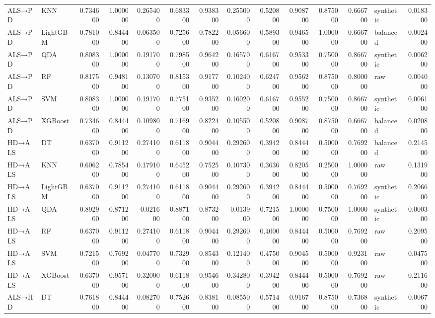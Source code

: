 \begin{longtable}{llrrrrrrrrrrlr}
ALS→PD & KNN & 0.734600 & 1.000000 & 0.265400 & 0.683300 & 0.938300 & 0.255000 & 0.520800 & 0.908700 & 0.875000 & 0.666700 & synthetic & 0.018300 \\
ALS→PD & LightGBM & 0.781000 & 0.844400 & 0.063500 & 0.725600 & 0.782200 & 0.056600 & 0.589300 & 0.946500 & 1.000000 & 0.666700 & balanced & 0.002400 \\
ALS→PD & QDA & 0.808300 & 1.000000 & 0.191700 & 0.798500 & 0.964200 & 0.165700 & 0.616700 & 0.953300 & 0.750000 & 0.866700 & synthetic & 0.006200 \\
ALS→PD & RF & 0.817500 & 0.948100 & 0.130700 & 0.815300 & 0.917700 & 0.102400 & 0.624700 & 0.956200 & 0.875000 & 0.800000 & raw & 0.004000 \\
ALS→PD & SVM & 0.808300 & 1.000000 & 0.191700 & 0.775100 & 0.935200 & 0.160200 & 0.616700 & 0.955200 & 0.750000 & 0.866700 & synthetic & 0.006100 \\
ALS→PD & XGBoost & 0.734600 & 0.844400 & 0.109800 & 0.716900 & 0.822400 & 0.105500 & 0.520800 & 0.908700 & 0.875000 & 0.666700 & balanced & 0.020800 \\
HD→ALS & DT & 0.637000 & 0.911200 & 0.274100 & 0.611800 & 0.904400 & 0.292600 & 0.394200 & 0.844400 & 0.500000 & 0.769200 & balanced & 0.214500 \\
HD→ALS & KNN & 0.606200 & 0.785400 & 0.179100 & 0.645200 & 0.752500 & 0.107300 & 0.363600 & 0.820500 & 0.250000 & 1.000000 & raw & 0.131900 \\
HD→ALS & LightGBM & 0.637000 & 0.911200 & 0.274100 & 0.611800 & 0.904400 & 0.292600 & 0.394200 & 0.844400 & 0.500000 & 0.769200 & synthetic & 0.206600 \\
HD→ALS & QDA & 0.892900 & 0.871200 & -0.021600 & 0.887100 & 0.873200 & -0.013900 & 0.721500 & 1.000000 & 0.750000 & 1.000000 & synthetic & 0.000300 \\
HD→ALS & RF & 0.637000 & 0.911200 & 0.274100 & 0.611800 & 0.904400 & 0.292600 & 0.400000 & 0.844400 & 0.500000 & 0.769200 & raw & 0.209500 \\
HD→ALS & SVM & 0.721500 & 0.769200 & 0.047700 & 0.732900 & 0.854300 & 0.121400 & 0.475000 & 0.904500 & 0.500000 & 0.923100 & raw & 0.047500 \\
HD→ALS & XGBoost & 0.637000 & 0.957100 & 0.320000 & 0.611800 & 0.954600 & 0.342800 & 0.394200 & 0.844400 & 0.500000 & 0.769200 & raw & 0.211600 \\
ALS→HD & DT & 0.761800 & 0.844400 & 0.082700 & 0.752600 & 0.838100 & 0.085500 & 0.571400 & 0.916700 & 0.875000 & 0.736800 & synthetic & 0.006700 \\

\end{longtable}
